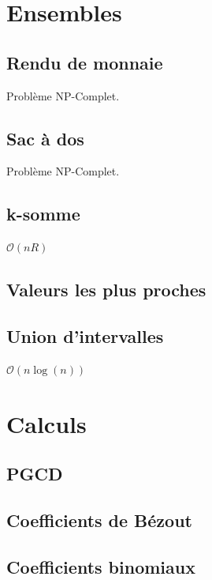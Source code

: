 \documentclass[8pt]{article}
\begin{document}
    \section{Ensembles}
        \subsection{Rendu de monnaie}
        Problème NP-Complet.
        {\scriptsize}
        \subsection{Sac à dos}
        Problème NP-Complet.
        {\scriptsize}
        \subsection{k-somme}
        $\mathcal{O}(nR)$
        {\scriptsize}
        \subsection{Valeurs les plus proches}
        {\scriptsize}
        \subsection{Union d'intervalles}
        $\mathcal{O}(n \log(n))$
        {\scriptsize}
    \section{Calculs}
        \subsection{PGCD}
        {\scriptsize}
        \subsection{Coefficients de Bézout}
        {\scriptsize}
        \subsection{Coefficients binomiaux}
        {\scriptsize}
\end{document}
